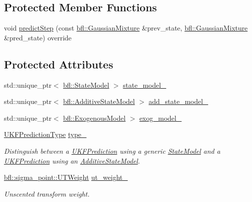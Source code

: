 \subsection*{Protected Member Functions}
\begin{DoxyCompactItemize}
\item 
void \mbox{\hyperlink{classbfl_1_1UKFPrediction_a0ffba56fa1aa4d71c6872e1d76bd2f02}{predict\+Step}} (const \mbox{\hyperlink{classbfl_1_1GaussianMixture}{bfl\+::\+Gaussian\+Mixture}} \&prev\+\_\+state, \mbox{\hyperlink{classbfl_1_1GaussianMixture}{bfl\+::\+Gaussian\+Mixture}} \&pred\+\_\+state) override
\end{DoxyCompactItemize}
\subsection*{Protected Attributes}
\begin{DoxyCompactItemize}
\item 
std\+::unique\+\_\+ptr$<$ \mbox{\hyperlink{classbfl_1_1StateModel}{bfl\+::\+State\+Model}} $>$ \mbox{\hyperlink{classbfl_1_1UKFPrediction_ae37986e02625b02d7a7257b3b37927a4}{state\+\_\+model\+\_\+}}
\item 
std\+::unique\+\_\+ptr$<$ \mbox{\hyperlink{classbfl_1_1AdditiveStateModel}{bfl\+::\+Additive\+State\+Model}} $>$ \mbox{\hyperlink{classbfl_1_1UKFPrediction_a5a46ad7497980d4ae42f8e25de991b95}{add\+\_\+state\+\_\+model\+\_\+}}
\item 
std\+::unique\+\_\+ptr$<$ \mbox{\hyperlink{classbfl_1_1ExogenousModel}{bfl\+::\+Exogenous\+Model}} $>$ \mbox{\hyperlink{classbfl_1_1UKFPrediction_afe3a156d96414991be025e951081ea68}{exog\+\_\+model\+\_\+}}
\item 
\mbox{\hyperlink{classbfl_1_1UKFPrediction_a122c74f8d8efa4d14f92abf82f96df68}{U\+K\+F\+Prediction\+Type}} \mbox{\hyperlink{classbfl_1_1UKFPrediction_ad5497af3dfea5662a7a8dc0f4f9d09d3}{type\+\_\+}}
\begin{DoxyCompactList}\small\item\em Distinguish between a \mbox{\hyperlink{classbfl_1_1UKFPrediction}{U\+K\+F\+Prediction}} using a generic \mbox{\hyperlink{classbfl_1_1StateModel}{State\+Model}} and a \mbox{\hyperlink{classbfl_1_1UKFPrediction}{U\+K\+F\+Prediction}} using an \mbox{\hyperlink{classbfl_1_1AdditiveStateModel}{Additive\+State\+Model}}. \end{DoxyCompactList}\item 
\mbox{\hyperlink{structbfl_1_1sigma__point_1_1UTWeight}{bfl\+::sigma\+\_\+point\+::\+U\+T\+Weight}} \mbox{\hyperlink{classbfl_1_1UKFPrediction_abb670fdf17bf2f2e91587904e115a029}{ut\+\_\+weight\+\_\+}}
\begin{DoxyCompactList}\small\item\em Unscented transform weight. \end{DoxyCompactList}\end{DoxyCompactItemize}


